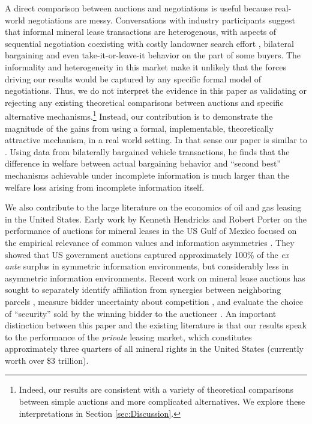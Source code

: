 \documentclass[12pt]{article}
\begin{document}
A direct comparison between auctions and negotiations is useful because real-world negotiations are messy.  Conversations with industry participants suggest that informal mineral lease transactions are heterogenous, with aspects of sequential negotiation coexisting with costly landowner search effort \citep{hortacsu_product_2004,allen_search_2014,cuesta2018price}, bilateral bargaining \citep{backus_cheap_2015, backus2, larsen_efficiency_2014} and even take-it-or-leave-it behavior on the part of some buyers.  The informality and heterogeneity in this market make it unlikely that the forces driving our results would be captured by any specific formal model of negotiations. Thus, we do not interpret the evidence in this paper as validating or rejecting any existing theoretical comparisons between auctions and specific alternative mechanisms.\footnote{Indeed, our results are consistent with a variety of theoretical comparisons between simple auctions and more complicated alternatives.  We explore these interpretations in Section \ref{sec:Discussion}.}  Instead, our contribution is to demonstrate the magnitude of the gains from using a formal, implementable, theoretically attractive mechanism, in a real world setting. In that sense our paper is similar to \cite{larsen_efficiency_2014}. Using data from bilaterally bargained vehicle transactions, he finds that the difference in welfare between actual bargaining behavior and ``second best'' mechanisms achievable under incomplete information is much larger than the \cite{myerson1983efficient} welfare loss arising from incomplete information itself.
 
We also contribute to the large literature on the economics of oil and gas leasing in the United States.  Early work by Kenneth Hendricks and Robert Porter on the performance of auctions for mineral leases in the US Gulf of Mexico focused on the empirical relevance of common values and information asymmetries \citep{hendricks_timing_1996, hendricks_empirical_1988}. They showed that US government auctions captured approximately 100\% of the \textit{ex ante} surplus in symmetric information environments, but considerably less in asymmetric information environments. Recent work on mineral lease auctions has sought to separately identify affiliation from synergies between neighboring parcels \citep{kong_selective_2017}, measure bidder uncertainty about competition \citep{kong2016sequential}, and evaluate the choice of ``security'' sold by the winning bidder to the auctioneer \citep{bhattacharya2018bidding}. An important distinction between this paper and the existing literature is that our results speak to the performance of the \textit{private} leasing market, which constitutes approximately three quarters of all mineral rights in the United States (currently worth over \$3 trillion).  
\end{document}
